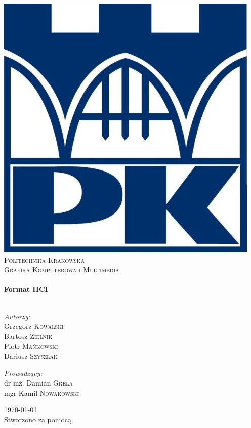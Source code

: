 \begin{titlepage}
\begin{center}

\includegraphics{./pk.jpg}~\\[1cm]

\textsc{\LARGE Politechnika Krakowska}\\[1.5cm]

\textsc{\Large Grafika Komputerowa i Multimedia}\\[0.5cm]

\HRule \\[0.4cm]
{ \huge \bfseries Format HCI \\[0.4cm] }
\HRule \\[1.5cm]

\noindent
\begin{minipage}[t]{0.4\textwidth}
\begin{flushleft}
\emph{Autorzy:}\\
Grzegorz \textsc{Kowalski}\\
Bartosz \textsc{Zielnik}\\
Piotr \textsc{Mańkowski}\\
Dariusz \textsc{Szyszlak}
\end{flushleft}
\end{minipage}
\begin{minipage}[t]{0.4\textwidth}
\begin{flushright}
\emph{Prowadzący:}\\
dr inż. Damian \textsc{Grela}\\
mgr Kamil \textsc{Nowakowski}
\end{flushright}
\end{minipage}

\vfill

{\large \today}\\
{\tiny Stworzono za pomocą \LaTeXe}

\end{center}
\end{titlepage}